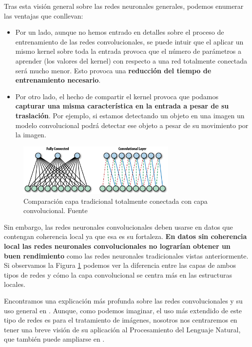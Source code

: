 Tras esta visión general sobre las redes neuronales generales, podemos enumerar las ventajas que conllevan: 

\begin{itemize}
	\item Por un lado, aunque no hemos entrado en detalles sobre el proceso de entrenamiento de las redes convolucionales, se puede intuir que el aplicar un mismo kernel sobre toda la entrada provoca que el número de parámetros a aprender (los valores del kernel) con respecto a una red totalmente conectada será mucho menor. Esto provoca una \textbf{reducción del tiempo de entrenamiento necesario}. 
	\item Por otro lado, el hecho de compartir el kernel provoca que podamos \textbf{capturar una misma característica en la entrada a pesar de su traslación}. Por ejemplo, si estamos detectando un objeto en una imagen un modelo convolucional podrá detectar ese objeto a pesar de su movimiento por la imagen. 
\end{itemize}


\begin{figure}[!ht]
	\centering
	\includegraphics[width=0.7\textwidth]{images/arte/traditionalvscnn}
	\caption{Comparación capa tradicional totalmente conectada con capa convolucional. Fuente \cite{hope_lieder_resheff_2017}}
	\label{fig:tradvscnn}
\end{figure}



Sin embargo, las redes neuronales convolucionales deben usarse en datos que contengan coherencia local ya que esa es su fortaleza. \textbf{En datos sin coherencia local las redes neuronales convolucionales no lograrían obtener un buen rendimiento} como las redes neuronales tradicionales vistas anteriormente. Si observamos la Figura \ref{fig:tradvscnn} podemos ver la diferencia entre las capas de ambos tipos de redes y cómo la capa convolucional se centra más en las estructuras locales.




Encontramos una explicación más profunda sobre las redes convolucionales y su uso general en \cite{temariodeeplearning}. Aunque, como podemos imaginar, el uso más extendido de este tipo de redes es para el tratamiento de imágenes, nosotros nos centraremos en tener una breve visión de su aplicación al Procesamiento del Lenguaje Natural, que también puede ampliarse en \cite{goldberg_2017}.



